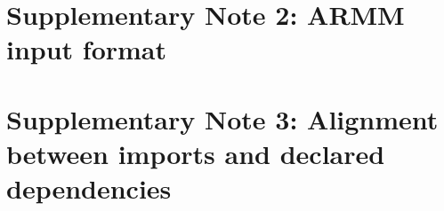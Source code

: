 \documentclass[pdflatex,sn-nature]{sn-jnl}%
\begin{document}
\section*{Supplementary Note 2: ARMM input format}\label{snote:armminput}


\section*{Supplementary Note 3: Alignment between imports and declared dependencies}\label{snote:iou}


%

\clearpage
\end{document}
